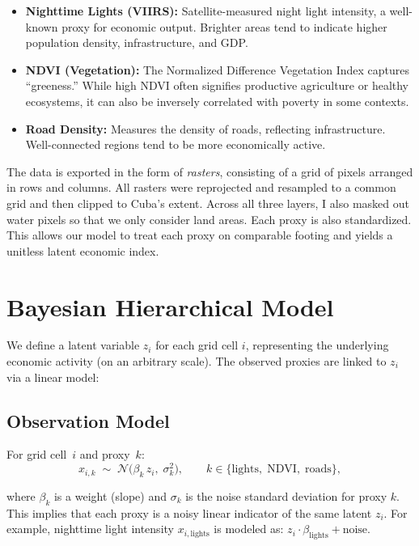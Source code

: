 \documentclass[12pt]{article}
\begin{document}
\label{sec:data}
\begin{itemize}
  \item \textbf{Nighttime Lights (VIIRS):} Satellite-measured night light intensity, a well-known proxy for economic output. Brighter areas tend to indicate higher population density, infrastructure, and GDP.
  \item \textbf{NDVI (Vegetation):} The Normalized Difference Vegetation Index captures “greeness.” While high NDVI often signifies productive agriculture or healthy ecosystems, it can also be inversely correlated with poverty in some contexts.
  \item \textbf{Road Density:} Measures the density of roads, reflecting infrastructure. Well-connected regions tend to be more economically active.

\end{itemize}

The data is exported in the form of \textit{rasters}, consisting of a grid of pixels arranged in rows and columns. All rasters were reprojected and resampled to a common grid and then clipped to Cuba's extent. Across all three layers, I also masked out water pixels so that we only consider land areas. Each proxy is also standardized. This allows our model to treat each proxy on comparable footing and yields a unitless latent economic index.

\section{Bayesian Hierarchical Model}
\label{sec:model}

We define a latent variable $z_i$ for each grid cell $i$, representing the underlying economic activity (on an arbitrary scale). The observed proxies are linked to $z_i$ via a linear model:

\subsection{Observation Model}
For grid cell~$i$ and proxy~$k$:
\[
x_{i,k} \;\sim\; \mathcal{N}\!\bigl(\beta_k\,z_i,\;\sigma_k^2\bigr),
\qquad
k \in \{\text{lights},\;\text{NDVI},\;\text{roads}\},
\]

where $\beta_k$ is a weight (slope) and $\sigma_k$ is the noise standard deviation for proxy $k$. This implies that each proxy is a noisy linear indicator of the same latent $z_i$. For example, nighttime light intensity $x_{i,\text{lights}}$ is modeled as: $z_i \cdot \beta_{\text{lights}} + \text{noise}$.
\end{document}

